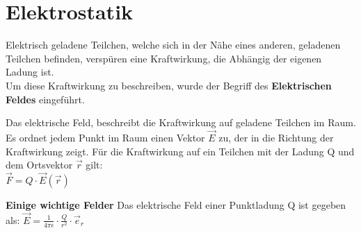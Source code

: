 
\section{Elektrostatik}
\label{chap:Style}


Elektrisch geladene Teilchen, welche sich in der Nähe eines anderen, geladenen Teilchen befinden, verspüren eine Kraftwirkung, die Abhängig der eigenen Ladung ist. \\
Um diese Kraftwirkung zu beschreiben, wurde der Begriff des \textbf{Elektrischen Feldes} eingeführt.

\beginip
Das elektrische Feld, beschreibt die Kraftwirkung auf geladene Teilchen im Raum. \\
Es ordnet jedem Punkt im Raum einen Vektor $\vec{E}$ zu, der in die Richtung der Kraftwirkung zeigt.
Für die Kraftwirkung auf ein Teilchen mit der Ladung Q und dem Ortsvektor $\vec{r}$ gilt: \\
\formulaBegin
$\vec{F} = Q \cdot \vec{E}(\vec{r})$
\formulaEnd
\iend

\vspace
\textbf{Einige wichtige Felder}
\beginbsp
Das elektrische Feld einer Punktladung Q ist gegeben als:
\formulaBegin
$\displaystyle \vec{E} = \frac{1}{4 \pi \epsilon} \cdot \frac{Q}{r^2}\cdot \vec{e}_r$
\formulaEnd
\begin{center}
\end{center}
\iend

\newpage


